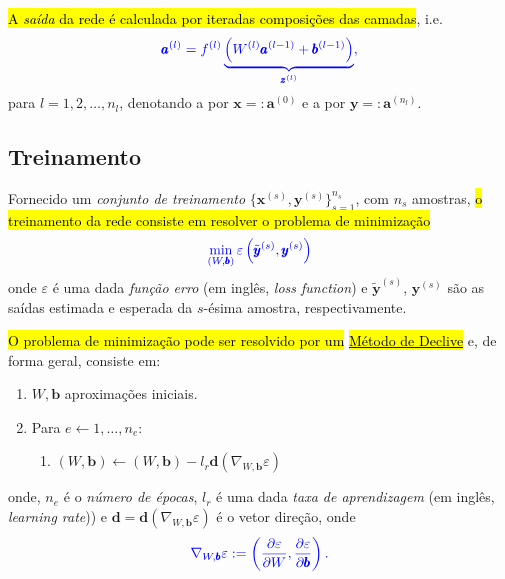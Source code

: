 \hl{A \emph{saída} da rede é calculada por iteradas composições das camadas}, i.e.
\begin{equation}\color{blue}\pmb{a}^{(l)} = f^{(l)}\underbrace{\left(W^{(l)}\pmb{a}^{(l-1)} + \pmb{b}^{(l-1)}\right)}_{\pmb{z}^{(l)}},
\end{equation}
para $l= 1, 2, \dotsc, n_l$, denotando a  por $\pmb{x} =: \pmb{a}^{(0)}$ e a  por $\pmb{y} =: \pmb{a}^{(n_l)}$.

\subsection{Treinamento}\label{cap_mlp_sec_modelo:ssec:treinamento}

Fornecido um \emph{conjunto de treinamento} $\{\pmb{x}^{(s)}, \pmb{y}^{(s)}\}_{s=1}^{n_s}$, com $n_s$ amostras, \hl{o treinamento da rede consiste em resolver o problema de minimização}
\begin{equation}\color{blue}\min_{(W,\pmb{b})}\varepsilon\left(\tilde{\pmb{y}}^{(s)}, \pmb{y}^{(s)}\right)
\end{equation}
onde $\varepsilon$ é uma dada \emph{função erro} (em inglês, \textit{loss function}) e $\tilde{\pmb{y}}^{(s)}$, $\pmb{y}^{(s)}$ são as saídas estimada e esperada da $s$-ésima amostra, respectivamente.

\hl{O problema de minimização pode ser resolvido por um }\href{https://notaspedrok.com.br/notas/MatematicaNumericaAvancada/cap\_otimizacao_sec_minimi.html}{\hl{Método de Declive}} e, de forma geral, consiste em:
\begin{enumerate}
\item $W, \pmb{b}$ aproximações iniciais.
\item Para $e\leftarrow 1, \dotsc, n_e$:
  \begin{enumerate}\hleq
  \item $\displaystyle (W, \pmb{b}) \leftarrow (W, \pmb{b}) - l_r\pmb{d}\left(\nabla_{W,\pmb{b}} \varepsilon\right)$
  \end{enumerate}
\end{enumerate}
onde, $n_e$ é o \emph{número de épocas}, $l_r$ é uma dada \emph{taxa de aprendizagem} (em inglês, \textit{learning rate})) e $\pmb{d} = \pmb{d}\left(\nabla_{W,\pmb{b}} \varepsilon\right)$ é o vetor direção, onde
\begin{equation}\color{blue}\nabla_{W, \pmb{b}} \varepsilon := \left(\frac{\partial\varepsilon}{\partial W}, \frac{\partial\varepsilon}{\partial\pmb{b}}\right).
\end{equation}

